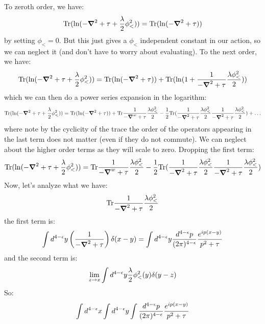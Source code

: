 To zeroth order, we have:
\begin{equation}
    \Tr(\ln(-\nabla^2 + \tau + \frac{\lambda}{2}\phi_<^2)) = \Tr(\ln(-\nabla^2 + \tau))
\end{equation}
by setting $\phi_< = 0$. But this just gives a $\phi_<$ independent constant in our action, so we can neglect it (and don't have to worry about evaluating). To the next order, we have:
\begin{equation}
    \Tr(\ln(-\nabla^2 + \tau + \frac{\lambda}{2}\phi_<^2)) = \Tr(\ln(-\nabla^2 + \tau)) + \Tr(\ln(1 + \frac{1}{-\nabla^2 + \tau}\frac{\lambda \phi_<^2}{2}))
\end{equation}
which we can then do a power series expansion in the logarithm:
\begin{equation}
    \Tr(\ln(-\nabla^2 + \tau + \frac{\lambda}{2}\phi_<^2)) = \Tr(\ln(-\nabla^2 + \tau)) + \Tr\frac{1}{-\nabla^w + \tau}\frac{\lambda \phi_<^2}{2} - \frac{1}{2}\Tr(\frac{1}{-\nabla^2 + \tau}\frac{\lambda \phi_<^2}{2}\frac{1}{-\nabla^2 + \tau}\frac{\lambda\phi_<^2}{2}) + \ldots
\end{equation}
where note by the cyclicity of the trace the order of the operators appearing in the last term does not matter (even if they do not commute).
We can neglect about the higher order terms as they will scale to zero. Dropping the first term:
\begin{equation}
    \Tr(\ln(-\nabla^2 + \tau + \frac{\lambda}{2}\phi_<^2)) = \Tr\frac{1}{-\nabla^w + \tau}\frac{\lambda \phi_<^2}{2} - \frac{1}{2}\Tr(\frac{1}{-\nabla^2 + \tau}\frac{\lambda \phi_<^2}{2}\frac{1}{-\nabla^2 + \tau}\frac{\lambda\phi_<^2}{2})
\end{equation}
Now, let's analyze what we have:
\begin{equation}
    \Tr\frac{1}{-\nabla^2 + \tau}\frac{\lambda \phi_<^2}{2}
\end{equation}
the first term is:
\begin{equation}
    \int d^{4-\e}y \left(\frac{1}{-\nabla^2 + \tau}\right)\delta(x - y) = \int d^{4-\e}y \frac{d^{4-\e}p}{(2\pi)^{4-\e}}\frac{e^{ip(x-y)}}{p^2 + \tau}
\end{equation}
and the second term is:
\begin{equation}
    \lim_{z \to x}\int d^{4-\e}y\frac{\lambda}{2}\phi_<^2(y) \delta(y - z)
\end{equation}
So:
\begin{equation}
    \int d^{4-\epsilon}x \int d^{4-\epsilon}y \int \frac{d^{4-\epsilon}p}{(2\pi)^{4-\epsilon}}\frac{e^{ip(x-y)}}{p^2 + \tau}
\end{equation}
